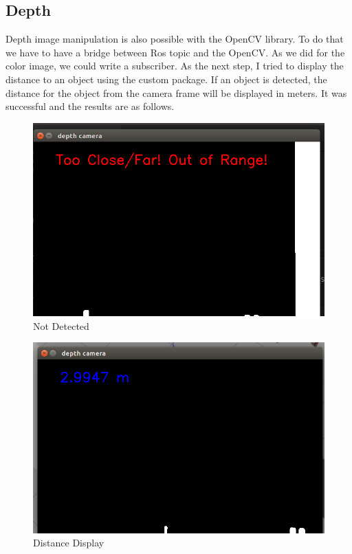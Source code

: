 \documentclass[twoside,12pt,times,onecolumn,a4paper]{report}
\begin{document}
\subsection{Depth}

Depth image manipulation is also possible with the OpenCV library. To do 
that we have to have a bridge between Ros topic and the OpenCV. As we did for the 
color image, we could write a subscriber. As the next step, I tried to display the 
distance to an object using the custom package. If an object is detected, the 
distance for the object from the camera frame will be displayed in meters. It was 
successful and the results are as follows.

\begin{figure}[H]
  \centering
   \includegraphics[width=15cm]{depth_output}
  \caption{Not Detected}
\end{figure}

\begin{figure}[H]
  \centering
   \includegraphics[width=15cm]{depth-out-dist}
  \caption{Distance Display}
\end{figure}
\end{document}
